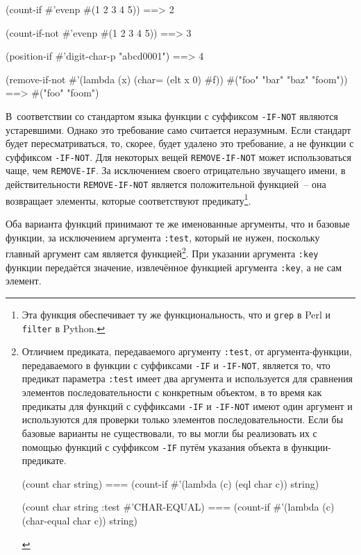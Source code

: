 \begin{myverb}
(count-if #'evenp #(1 2 3 4 5))         ==> 2

(count-if-not #'evenp #(1 2 3 4 5))     ==> 3

(position-if #'digit-char-p "abcd0001") ==> 4

(remove-if-not #'(lambda (x) (char= (elt x 0) #\bslash{}f))
  #("foo" "bar" "baz" "foom")) ==> #("foo" "foom")
\end{myverb}

В~соответствии со стандартом языка функции с суффиксом \lstinline{-IF-NOT} являются
устаревшими.  Однако это требование само считается неразумным.  Если стандарт будет
пересматриваться, то, скорее, будет удалено это требование, а не функции с суффиксом
\lstinline{-IF-NOT}.  Для некоторых вещей \lstinline{REMOVE-IF-NOT} может использоваться чаще, чем
\lstinline{REMOVE-IF}.  За исключением своего отрицательно звучащего имени, в действительности
\lstinline{REMOVE-IF-NOT} является положительной функцией~-- она возвращает элементы, которые
соответствуют предикату\footnote{Эта функция обеспечивает ту же функциональность, что и
  \lstinline{grep} в Perl и \lstinline{filter} в Python.}\hspace{\footnotenegspace}.

Оба варианта функций принимают те же именованные аргументы, что и базовые функции, за
исключением аргумента \lstinline{:test}, который не нужен, поскольку главный аргумент сам
является функцией\footnote{Отличием предиката, передаваемого аргументу \lstinline{:test}, от
  аргумента-функции, передаваемого в функции с суффиксами \lstinline{-IF} и \lstinline{-IF-NOT},
  является то, что предикат параметра \lstinline{:test} имеет два аргумента и используется для
  сравнения элементов последовательности с конкретным объектом, в то время как предикаты
  для функций с суффиксами \lstinline{-IF} и \lstinline{-IF-NOT} имеют один аргумент и используются
  для проверки только элементов последовательности.  Если бы базовые варианты не
  существовали, то вы могли бы реализовать их с помощью функций с суффиксом \lstinline{-IF}
  путём указания объекта в функции-предикате.

\begin{myverb}
(count char string) ===
  (count-if #'(lambda (c) (eql char c)) string)

(count char string :test #'CHAR-EQUAL) ===
  (count-if #'(lambda (c) (char-equal char c)) string)
\end{myverb}

}\hspace{\footnotenegspace}.  При указании аргумента \lstinline{:key} функции передаётся значение, извлечённое функцией
аргумента \lstinline{:key}, а не сам элемент.

